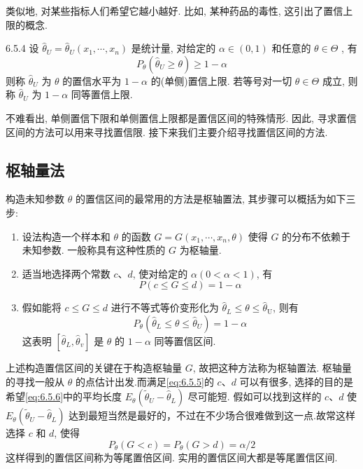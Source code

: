 类似地, 对某些指标人们希望它越小越好. 比如, 某种药品的毒性, 这引出了置信上限的概念.

\begin{definition}{}{6.5.4}
设 $\hat{\theta}_{U}=\hat{\theta}_{U}\left(x_{1}, \cdots, x_{n}\right)$ 是统计量, 对给定的 $\alpha\in(0,1)$ 和任意的 $\theta\in\Theta$ , 有
\begin{equation}\label{eq:6.5.4}
P_{\theta}\left(\hat{\theta}_{U} \geqslant \theta\right) \geqslant 1-\alpha
\end{equation}
则称 $\hat{\theta}_{U}$ 为 $\theta$ 的置信水平为 $1-\alpha$ 的{\heiti (单侧)置信上限}. 若等号对一切 $\theta\in\Theta$ 成立, 则称 $\hat{\theta}_{U}$ 为 $1-\alpha$ {\heiti 同等置信上限}.
\end{definition}

不难看出, 单侧置信下限和单侧置信上限都是置信区间的特殊情形. 因此, 寻求置信区间的方法可以用来寻找置信限. 接下来我们主要介绍寻找置信区间的方法.

\subsection{枢轴量法}\label{ssec:6.5.2}

构造未知参数 $\theta$ 的置信区间的最常用的方法是{\heiti 枢轴置法}, 其步骤可以概括为如下三步:
\begin{enumerate}
\item 设法构造一个样本和 $\theta$ 的函数 $G=G\left(x_{1}, \cdots, x_{n}, \theta\right)$ 使得 $G$ 的分布不依赖于未知参数. 一般称具有这种性质的 $G$ 为枢轴量.
\item 适当地选择两个常数 $c$、$d$, 使对给定的 $\alpha (0<\alpha<1)$, 有
\begin{equation}\label{eq:6.5.5}
P(c \leqslant G \leqslant d)=1-\alpha
\end{equation}
\item 假如能将 $c\leqslant G\leqslant d$ 进行不等式等价变形化为 $\hat{\theta}_{L} \leqslant \theta \leqslant \hat{\theta}_{\mathrm{U}}$, 则有
\begin{equation}\label{eq:6.5.6}
P_{\theta}\left(\hat{\theta}_{L} \leqslant \theta \leqslant \hat{\theta}_{U}\right)=1-\alpha
\end{equation}
这表明 $\left[\hat{\theta}_{L}, \hat{\theta}_{v}\right]$ 是 $\theta$ 的 $1-\alpha$ 同等置信区间.
\end{enumerate}
上述构造置信区间的关键在于构造枢轴量 $G$, 故把这种方法称为{\heiti 枢轴置法}. 枢轴量的寻找一般从 $\theta$ 的点估计出发.而满足\ref{eq:6.5.5}的 $c$、$d$ 可以有很多, 选择的目的是希望\ref{eq:6.5.6}中的平均长度 $E_{\theta}\left(\tilde{\theta}_{U}-\hat{\theta}_{L}\right)$ 尽可能短.
假如可以找到这样的 $c$、$d$ 使 $E_{\theta}\left(\tilde{\theta}_{U}-\hat{\theta}_{L}\right)$ 达到最短当然是最好的，不过在不少场合很难做到这一点.故常这样选择 $c$ 和 $d$, 使得
\begin{equation}\label{eq:6.5.7}
P_{\theta}(G<c)=P_{\theta}(G>d)=\alpha / 2
\end{equation}
这样得到的置信区间称为{\heiti 等尾置倍区间}. 实用的置信区间大都是等尾置信区间.

